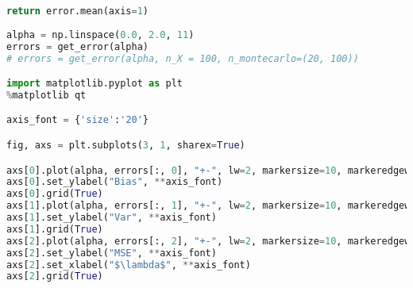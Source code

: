 \documentclass{article}
\begin{document}
\begin{lstlisting}[language=Python]
    return error.mean(axis=1)
    
alpha = np.linspace(0.0, 2.0, 11)
errors = get_error(alpha)
# errors = get_error(alpha, n_X = 100, n_montecarlo=(20, 100))

import matplotlib.pyplot as plt
%matplotlib qt

axis_font = {'size':'20'}

fig, axs = plt.subplots(3, 1, sharex=True)

axs[0].plot(alpha, errors[:, 0], "+-", lw=2, markersize=10, markeredgewidth=2)
axs[0].set_ylabel("Bias", **axis_font)
axs[0].grid(True)
axs[1].plot(alpha, errors[:, 1], "+-", lw=2, markersize=10, markeredgewidth=2)
axs[1].set_ylabel("Var", **axis_font)
axs[1].grid(True)
axs[2].plot(alpha, errors[:, 2], "+-", lw=2, markersize=10, markeredgewidth=2)
axs[2].set_ylabel("MSE", **axis_font)
axs[2].set_xlabel("$\lambda$", **axis_font)
axs[2].grid(True)
\end{lstlisting} 
  
\end{document}
